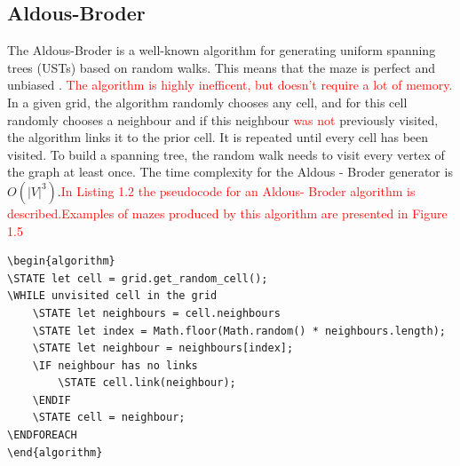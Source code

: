 \subsection{Aldous-Broder}

The Aldous-Broder is a well-known algorithm for generating uniform spanning trees (USTs) based on random walks. This means that the maze is perfect and unbiased \cite{Nunes}. \textcolor{red}{The algorithm is highly inefficent, but doesn't require a lot of memory.} In a given grid, the algorithm randomly chooses any cell, and for this cell randomly chooses a neighbour and if this neighbour \textcolor{red}{was not} previously visited, the algorithm links it to the prior cell. It is repeated until every cell has been visited. To build a spanning tree, the random walk needs to visit every vertex of the graph at least once. The time complexity for the Aldous - Broder generator is $O(|V|^3)$.\textcolor{red}{In Listing 1.2 the pseudocode for an Aldous- Broder algorithm is described.Examples of mazes produced by this algorithm are presented in Figure 1.5}
\newline
\begin{lstlisting}[caption={Pseudocode for an Aldous-Broder algorithm}]
\begin{algorithm}
\STATE let cell = grid.get_random_cell();
\WHILE unvisited cell in the grid
	\STATE let neighbours = cell.neighbours
	\STATE let index = Math.floor(Math.random() * neighbours.length);
	\STATE let neighbour = neighbours[index];
	\IF neighbour has no links
		\STATE cell.link(neighbour);
	\ENDIF
	\STATE cell = neighbour;
\ENDFOREACH
\end{algorithm}
\end{lstlisting}

